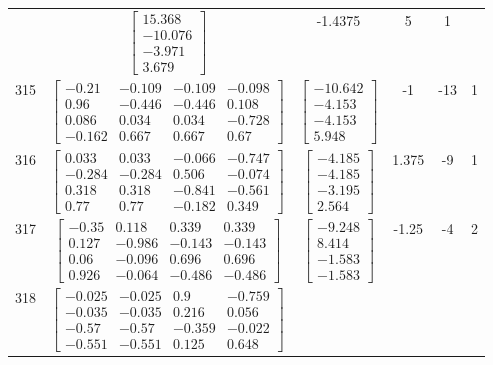 \documentclass[a4paper,12pt]{article}
\begin{document}
\begin{tabular}{c c c c c c}
&
$\begin{bmatrix} 15.368 \\ -10.076 \\ -3.971 \\ 3.679 \end{bmatrix}$
&
-1.4375
&
5
&
1
\\
315
&
$\begin{bmatrix} -0.21 & -0.109 & -0.109 & -0.098 \\ 0.96 & -0.446 & -0.446 & 0.108 \\ 0.086 & 0.034 & 0.034 & -0.728 \\ -0.162 & 0.667 & 0.667 & 0.67 \end{bmatrix}$
&
$\begin{bmatrix} -10.642 \\ -4.153 \\ -4.153 \\ 5.948 \end{bmatrix}$
&
-1
&
-13
&
1
\\
316
&
$\begin{bmatrix} 0.033 & 0.033 & -0.066 & -0.747 \\ -0.284 & -0.284 & 0.506 & -0.074 \\ 0.318 & 0.318 & -0.841 & -0.561 \\ 0.77 & 0.77 & -0.182 & 0.349 \end{bmatrix}$
&
$\begin{bmatrix} -4.185 \\ -4.185 \\ -3.195 \\ 2.564 \end{bmatrix}$
&
1.375
&
-9
&
1
\\
317
&
$\begin{bmatrix} -0.35 & 0.118 & 0.339 & 0.339 \\ 0.127 & -0.986 & -0.143 & -0.143 \\ 0.06 & -0.096 & 0.696 & 0.696 \\ 0.926 & -0.064 & -0.486 & -0.486 \end{bmatrix}$
&
$\begin{bmatrix} -9.248 \\ 8.414 \\ -1.583 \\ -1.583 \end{bmatrix}$
&
-1.25
&
-4
&
2
\\
318
&
$\begin{bmatrix} -0.025 & -0.025 & 0.9 & -0.759 \\ -0.035 & -0.035 & 0.216 & 0.056 \\ -0.57 & -0.57 & -0.359 & -0.022 \\ -0.551 & -0.551 & 0.125 & 0.648 \end{bmatrix}$

\end{tabular}
\end{document}
